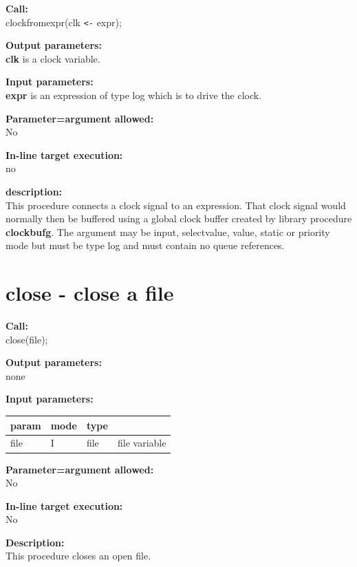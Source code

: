         {\bf Call:} \\
        clockfromexpr(clk \verb'<-' expr);

        {\bf Output parameters:} \\
        {\bf clk} is a clock variable.

        {\bf Input parameters:} \\            
        {\bf expr} is an expression of type log which is to drive the clock.
        
        {\bf Parameter=argument allowed:} \\
        No

        {\bf In-line target execution:} \\
        no

        {\bf description:} \\
        This procedure connects a clock signal to an expression. That
        clock signal would normally then be buffered using a global clock
        buffer created by library procedure {\bf clockbufg}.
        The argument may be input, selectvalue, value, static or priority mode
        but must be type log and must contain no queue references.



    \section{close - close a file}\label{sec:ipclose}
        
        {\bf Call:} \\
        close(file);
        
        {\bf Output parameters:} \\
        none
        
        {\bf Input parameters:} \\
        \begin{tabular}{| l | l | l | l |}
        \hline
        param  & mode & type  & \\
        \hline \hline
        file & I & file & file variable   \\ \hline
        \end{tabular}
        
        {\bf Parameter=argument allowed:} \\
        No
        
        {\bf In-line target execution:} \\
        No
        
        {\bf Description:} \\
        This procedure closes an open file.



